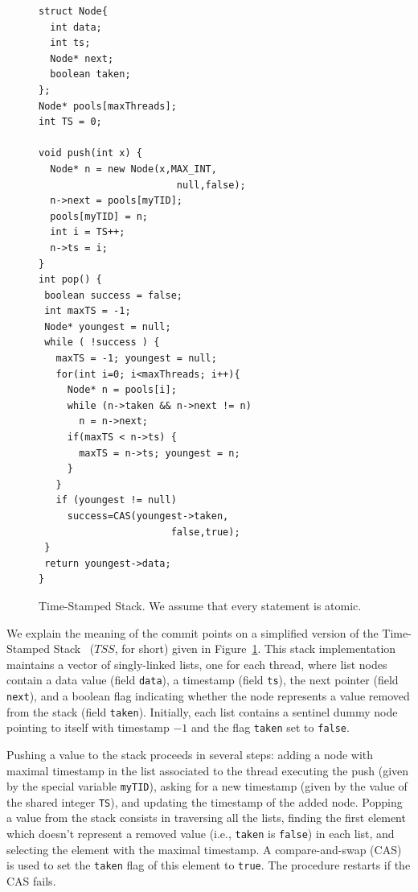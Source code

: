 \begin{figure}
\vspace{-11mm}
\begin{lstlisting}
struct Node{
  int data;
  int ts;
  Node* next;
  boolean taken;
};
Node* pools[maxThreads];
int TS = 0;   

void push(int x) {
  Node* n = new Node(x,MAX_INT,
                        null,false);
  n->next = pools[myTID];
  pools[myTID] = n;
  int i = TS++;
  n->ts = i;
}
int pop() {
 boolean success = false;
 int maxTS = -1;
 Node* youngest = null;
 while ( !success ) {
   maxTS = -1; youngest = null;
   for(int i=0; i<maxThreads; i++){
     Node* n = pools[i];
     while (n->taken && n->next != n)
       n = n->next;
     if(maxTS < n->ts) {
       maxTS = n->ts; youngest = n;
     }
   }
   if (youngest != null)
     success=CAS(youngest->taken,
                       false,true);
 }
 return youngest->data;
}
\end{lstlisting}
\vspace{-6mm}
\caption{Time-Stamped Stack. We assume that every statement is atomic.}
\label{fig:TimeStamped}
\vspace{-8mm}
\end{figure}
We explain the meaning of the commit points on a simplified version of the Time-Stamped Stack~\cite{DBLP:conf/popl/DoddsHK15} ($\mathit{TSS}$, for short) given in Figure~\ref{fig:TimeStamped}. This stack implementation maintains a vector of singly-linked lists, one for each thread, where list nodes contain a data value (field {\tt data}), a timestamp (field {\tt ts}), the next pointer (field {\tt next}), and a boolean flag indicating whether the node represents a value removed from the stack (field {\tt taken}). Initially, each list contains a sentinel dummy node pointing to itself with timestamp $-1$ and the flag {\tt taken} set to {\tt false}.

Pushing a value to the stack proceeds in several steps: adding a node with maximal timestamp in the list associated to the thread executing the push (given by the special variable {\tt myTID}), asking for a new timestamp (given by the value of the shared integer {\tt TS}), and updating the timestamp of the added node. Popping a value from the stack consists in traversing all the lists, finding the first element which doesn't represent a removed value (i.e., {\tt taken} is {\tt false}) in each list, and selecting the element with the maximal timestamp. A compare-and-swap (CAS) is used to set the {\tt taken} flag of this element to {\tt true}. The procedure restarts if the CAS fails.

